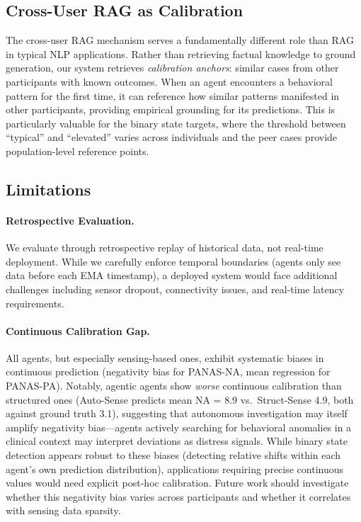 \documentclass[screen,review,anonymous]{acmart}
\begin{document}
\subsection{Cross-User RAG as Calibration}

The cross-user RAG mechanism serves a fundamentally different role than RAG in typical NLP applications. Rather than retrieving factual knowledge to ground generation, our system retrieves \emph{calibration anchors}: similar cases from other participants with known outcomes. When an agent encounters a behavioral pattern for the first time, it can reference how similar patterns manifested in other participants, providing empirical grounding for its predictions. This is particularly valuable for the binary state targets, where the threshold between ``typical'' and ``elevated'' varies across individuals and the peer cases provide population-level reference points.

\subsection{Limitations}

\paragraph{Retrospective Evaluation.}
We evaluate through retrospective replay of historical data, not real-time deployment. While we carefully enforce temporal boundaries (agents only see data before each EMA timestamp), a deployed system would face additional challenges including sensor dropout, connectivity issues, and real-time latency requirements.

\paragraph{Continuous Calibration Gap.}
All agents, but especially sensing-based ones, exhibit systematic biases in continuous prediction (negativity bias for PANAS-NA, mean regression for PANAS-PA). Notably, agentic agents show \emph{worse} continuous calibration than structured ones (Auto-Sense predicts mean NA = 8.9 vs.\ Struct-Sense 4.9, both against ground truth 3.1), suggesting that autonomous investigation may itself amplify negativity bias---agents actively searching for behavioral anomalies in a clinical context may interpret deviations as distress signals. While binary state detection appears robust to these biases (detecting relative shifts within each agent's own prediction distribution), applications requiring precise continuous values would need explicit post-hoc calibration. Future work should investigate whether this negativity bias varies across participants and whether it correlates with sensing data sparsity.
\end{document}
